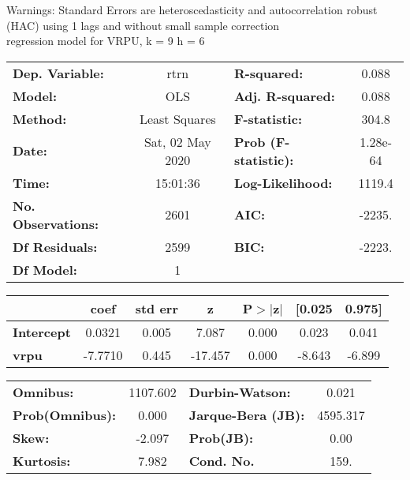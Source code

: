 Warnings: \newline
 [1] Standard Errors are heteroscedasticity and autocorrelation robust (HAC) using 1 lags and without small sample correction\\ 

regression model for VRPU, k = 9 h = 6\begin{center}
\begin{tabular}{lclc}
\toprule
\textbf{Dep. Variable:}    &       rtrn       & \textbf{  R-squared:         } &     0.088   \\
\textbf{Model:}            &       OLS        & \textbf{  Adj. R-squared:    } &     0.088   \\
\textbf{Method:}           &  Least Squares   & \textbf{  F-statistic:       } &     304.8   \\
\textbf{Date:}             & Sat, 02 May 2020 & \textbf{  Prob (F-statistic):} &  1.28e-64   \\
\textbf{Time:}             &     15:01:36     & \textbf{  Log-Likelihood:    } &    1119.4   \\
\textbf{No. Observations:} &        2601      & \textbf{  AIC:               } &    -2235.   \\
\textbf{Df Residuals:}     &        2599      & \textbf{  BIC:               } &    -2223.   \\
\textbf{Df Model:}         &           1      & \textbf{                     } &             \\
\bottomrule
\end{tabular}
\begin{tabular}{lcccccc}
                   & \textbf{coef} & \textbf{std err} & \textbf{z} & \textbf{P$> |$z$|$} & \textbf{[0.025} & \textbf{0.975]}  \\
\midrule
\textbf{Intercept} &       0.0321  &        0.005     &     7.087  &         0.000        &        0.023    &        0.041     \\
\textbf{vrpu}      &      -7.7710  &        0.445     &   -17.457  &         0.000        &       -8.643    &       -6.899     \\
\bottomrule
\end{tabular}
\begin{tabular}{lclc}
\textbf{Omnibus:}       & 1107.602 & \textbf{  Durbin-Watson:     } &    0.021  \\
\textbf{Prob(Omnibus):} &   0.000  & \textbf{  Jarque-Bera (JB):  } & 4595.317  \\
\textbf{Skew:}          &  -2.097  & \textbf{  Prob(JB):          } &     0.00  \\
\textbf{Kurtosis:}      &   7.982  & \textbf{  Cond. No.          } &     159.  \\
\bottomrule
\end{tabular}
\end{center}

